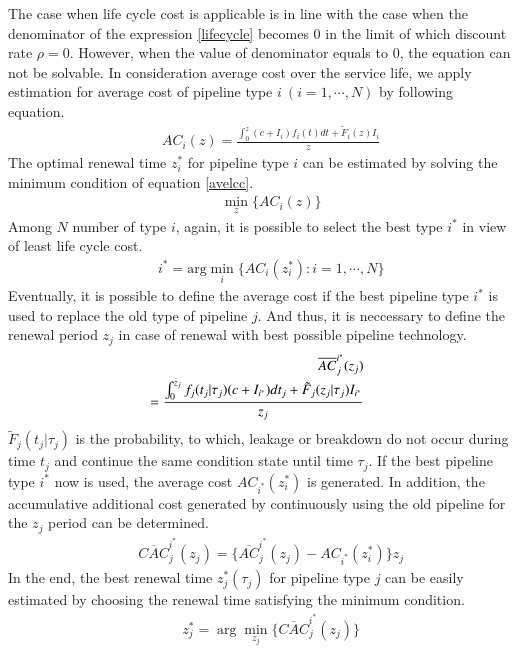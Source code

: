 \documentclass[a4paper,oneside,onecolumn,preprint,10pt,authoryear]{elsarticle}
\begin{document}
The case when life cycle cost is applicable is in line with the case when the denominator of the expression \ref{lifecycle} becomes $0$ in the limit of which discount rate $\rho=0$. However, when the value of denominator equals to $0$, the equation can not be solvable. In consideration average cost over the service life, we apply estimation for average cost of pipeline type 
$i~(i=1,\cdots,N)$ by following equation.
\begin{eqnarray}
&& AC_i(z)=\frac{\int_0^{z} (c+I_i) f_i(t) dt  +  \tilde{F}_i(z)I_i}{z} \label{avelcc}
\end{eqnarray}
The optimal renewal time $z_i^\ast$ for pipeline type $i$ can be estimated by solving the minimum condition of equation \ref{avelcc}.
\begin{eqnarray}
&& \min_{z}\{ AC_i(z) \}\label{iimp}
\end{eqnarray}
Among $N$ number of type $i$, again, it is possible to select the best type $i^\ast$ in view of least life cycle cost. 
\begin{eqnarray}
&& i^\ast=\mbox{arg} \min_{i}\{ AC_i(z_i^\ast):i=1,\cdots,N\}
\end{eqnarray}
Eventually, it is possible to define the average cost if the best pipeline type $i^\ast$ is used to replace the old type of pipeline $j$. And thus, it is neccessary to define the renewal period $z_j$ in case of renewal with best possible pipeline technology.
\begin{eqnarray}
&& \hspace{-5mm} \overline{AC}_j^{i^\ast}(z_j)\nonumber \\
&& \hspace{-5mm} =\frac{\int_0^{z_j} f_j(t_j|\tau_j)(c+I_{i^\ast}) dt_j  + \tilde{F}_j(z_j|\tau_j)I_{i^\ast} }{z_j} \label{han1}
\end{eqnarray}
$\tilde{F}_j(t_j|\tau_j)$ is the probability, to which, leakage or breakdown do not occur during time $t_j$ and continue the same condition state until time $\tau_j$. If the best pipeline type $i^\ast$ now is used, the average cost $AC_{i^\ast}(z_i^\ast)$ is generated. In addition, the accumulative additional cost generated by continuously using the old pipeline for the $z_j$ period can be determined. 
\begin{eqnarray}
&& \overline{CAC}_j^{i^\ast}(z_j)= \{\overline{AC}_j^{i^\ast}(z_j)-AC_{i^\ast}(z_i^\ast)\}z_j
\end{eqnarray}
In the end, the best renewal time $z_j^\ast(\tau_j)$ for pipeline type $j$ can be easily estimated by choosing the renewal time satisfying the minimum condition. 
\begin{eqnarray}
&& z_j^\ast=\arg \min_{z_j} \{\overline{CAC}_j^{i^\ast}(z_j)\} \label{ssa}
\end{eqnarray}
\end{document}
